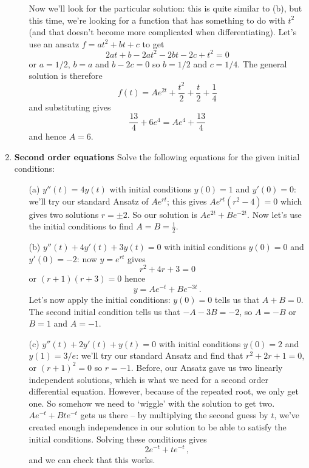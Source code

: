 \documentclass[11pt,a4paper]{scrartcl}
\begin{document}
\begin{enumerate}
\begin{itemize}
    Now we'll look for the particular solution: this is quite similar to (b), but this time, we're looking for a function that has something to do with $t^2$ (and that doesn't become more complicated when differentiating). Let's use an ansatz $f=at^2+bt+c$ to get
          $$2at+b-2at^2-2bt-2c+t^2=0$$
          or $a=1/2$, $b=a$ and $b-2c=0$ so $b=1/2$ and $c=1/4$. The general solution is therefore
          $$f(t)=Ae^{2t}+\frac{t^2}{2}+\frac{t}{2}+\frac{1}{4}$$
          and substituting gives
          $$\frac{13}{4}+6e^4=Ae^4+\frac{13}{4}$$
          and hence $A=6$.
	\end{itemize}

\item \textbf{Second order equations} Solve the following equations for the given initial conditions:
	\begin{itemize}
		\item[(a)] ${y}''(t) = 4y(t)$ with initial conditions $y(0) = 1$ and $y'(0) = 0$: 
        we'll try our standard Ansatz of $Ae^{rt}$; this gives $Ae^{rt}(r^2-4)=0$ which gives two solutions $r=\pm 2$. So our solution is $Ae^{2t}+Be^{-2t}$. Now let's use the initial conditions to find $A=B=\frac12$.
        
		\item[(b)] ${y''}(t) + 4y'(t) + 3y(t) = 0$ with initial conditions $y(0) = 0$ and $y'(0) = -2$: now $y=e^{rt}$ gives
                  $$r^2+4r+3=0$$
                  or $(r+1)(r+3)=0$ hence
                  $$y=Ae^{-t}+Be^{-3t}\,.$$
                  Let's now apply the initial conditions: $y(0)=0$ tells us that $A+B=0$. The second initial condition tells us that $-A-3B=-2$, so $A=-B$ or $B=1$ and $A=-1$.
                  
                \item[(c)] ${y}''(t) + 2y'(t) + y(t) = 0$ with initial conditions $y(0) = 2$ and $y(1) = 3/e$:
                we'll try our standard Ansatz and find that $r^2+2r+1=0$, or $(r+1)^2=0$ so $r=-1$. 
                Before, our Ansatz gave us two linearly independent solutions, which is what we need for a second order differential equation. However, because of the repeated root, we only get one.
                So somehow we need to `wiggle' with the solution to get two. $Ae^{-t} + Bte^{-t}$ gets us there -- by multiplying the second guess by $t$, we've created enough independence in our solution to be able to satisfy the initial conditions. Solving these conditions gives 
                \[
                2e^{-t} + te^{-t}\,,
                \]
                and we can check that this works.
	\end{itemize}


\end{enumerate}
\end{document}
